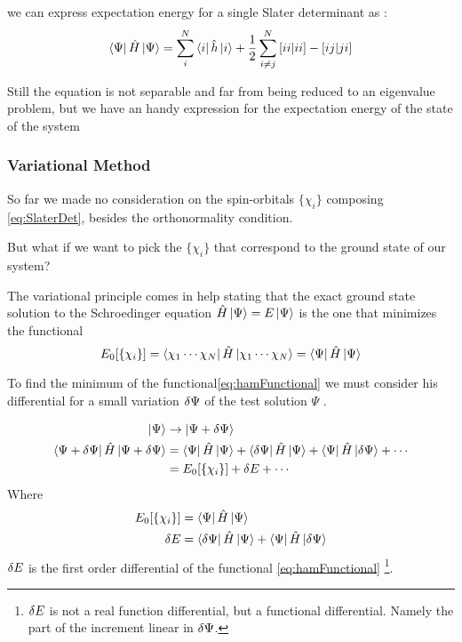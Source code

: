 \documentclass[a4paper,12pt]{article}
\newcommand{\jsqrt}[2]{\bqty{ #1 #1 | #2 #2 }}
\newcommand{\ksqrt}[2]{\bqty{ #1 #2 | #2 #1 }}
\begin{document}
we can express expectation energy for a single Slater determinant as :
\begin{equation}
	\bra{\Psi} \hat{H} \ket{\Psi} = \sum_{i}^{N} \bra{i} \hat{h} \ket{i} + \frac{1}{2} \sum_{i \neq j}^{N} \jsqrt{i}{i} - \ksqrt{i}{j}
\end{equation}

Still the equation is not separable and far from being reduced to an eigenvalue problem, but we have an handy expression for the expectation energy of the state of the system

\subsubsection{Variational Method}
So far we made no consideration on the spin-orbitals $\{ \chi_{i} \}$ composing \eqref{eq:SlaterDet}, besides the orthonormality condition.

But what if we want to pick the $\{ \chi_{i} \}$ that correspond to the ground state of our system?

The variational principle comes in help stating that the exact ground state solution to the Schroedinger equation $\hat{H} \ket{\Psi} = E \ket{\Psi}$ is the one that minimizes the functional 
\begin{equation} \label{eq:hamFunctional}
	E_{0}[\{\chi_{i}\}] = \bra{\chi_1 \cdots \chi_N} \hat{H} \ket{\chi_1 \cdots \chi_N} = \bra{\Psi} \hat{H} \ket{\Psi}
\end{equation}

To find the minimum of the functional\eqref{eq:hamFunctional} we must consider his differential for a small variation $\var{\Psi}$ of the test solution $\Psi$  \cite[p.165]{Carati}.  

\begin{align}
	\ket{\Psi} & \rightarrow \ket{\Psi + \var{\Psi}} 
\\
	\bra{\Psi + \var{\Psi}} \hat{H} \ket{\Psi + \var{\Psi}} & = 
		\bra{\Psi} \hat{H} \ket{\Psi} 
		+ \bra{\var{\Psi}} \hat{H} \ket{\Psi} 
		+ \bra{\Psi} \hat{H} \ket{\var{\Psi}} 
		+ \cdots
\\
		 & = E_{0}[\{\chi_{i}\}] + \var{E} + \cdots
\end{align}
Where
\begin{align}
	E_{0}[\{\chi_{i}\}] & = 	\bra{\Psi} \hat{H} \ket{\Psi}  \\
	\var{E} & = \bra{\var{\Psi}} \hat{H} \ket{\Psi} 	+ \bra{\Psi} \hat{H} \ket{\var{\Psi}} 
\end{align}
$\var{E}$ is the first order differential of the functional \eqref{eq:hamFunctional} \footnote{$\var{E}$ is not a real function differential, but a functional differential. Namely the part of the increment linear in $\var{\Psi}$.}.
\end{document}
